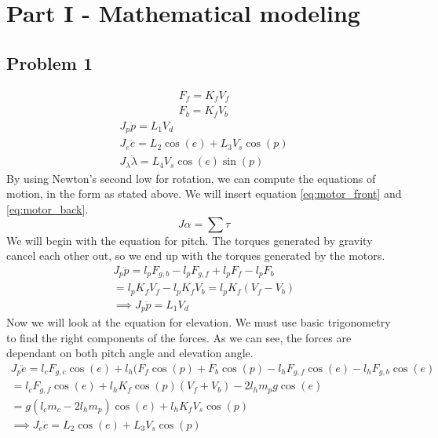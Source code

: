 \section{Part I - Mathematical modeling}\label{sec:part1}

\subsection{Problem 1}
\begin{subequations} \label{eq:motor}
    \begin{gather}
        F_f = K_f V_f \label{eq:motor_front} \\
        F_b = K_f V_b \label{eq:motor_back}
    \end{gather}
\end{subequations}
\begin{subequations} \label{eq:model}
    \begin{gather}
        J_p \ddot{p} = L_1 V_d \label{eq:model_pitch}\\
        J_e \ddot{e} = L_2 \cos(e) + L_3 V_s \cos(p) \label{eq:model_elev}\\
        J_{\lambda} \ddot{\lambda} = L_4 V_s \cos(e) \sin(p) \label{eq:model_travel}
    \end{gather}
\end{subequations}
By using Newton's second low for rotation, we can compute the equations of motion, in the form as stated above. We will insert equation \eqref{eq:motor_front} and \eqref{eq:motor_back}.
\begin{equation} \label{eq:newton2rot}
    J \alpha = \sum{\tau}
\end{equation}
We will begin with the equation for pitch. The torques generated by gravity cancel each other out, so we end up with the torques generated by the motors.
\begin{gather*}
    J_p \ddot{p} = l_p F_{g,b} - l_p F_{g,f} + l_p F_f - l_p F_b \\
    = l_p K_f V_f - l_p K_f V_b = l_p K_f (V_f - V_b) \\
    \implies J_p \ddot{p} = L_1 V_d
\end{gather*}
Now we will look at the equation for elevation. We must use basic trigonometry to find the right components of the forces. As we can see, the forces are dependant on both pitch angle and elevation angle.
\begin{gather*}
    J_p \ddot{e} = l_c F_{g,c} \cos(e) + l_h (F_f \cos(p) + F_b \cos(p) - l_h F_{g,f} \cos(e) - l_h F_{g,b} \cos(e) \\
    = l_c F_{g,f} \cos(e) + l_h K_f \cos(p) (V_f + V_b) - 2 l_h m_p g \cos(e) \\
    = g(l_c m_c - 2 l_h m_p) \cos(e) + l_h K_f V_s \cos(p) \\
    \implies J_e \ddot{e} = L_2 \cos(e) + L_3 V_s \cos(p)
\end{gather*}
